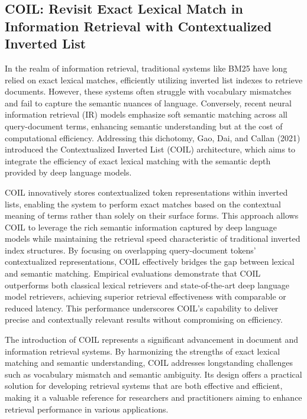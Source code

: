 \subsection{COIL: Revisit Exact Lexical Match in Information Retrieval with Contextualized Inverted List}

In the realm of information retrieval, traditional systems like BM25 have long relied on exact lexical matches, efficiently utilizing inverted list indexes to retrieve documents. However, these systems often struggle with vocabulary mismatches and fail to capture the semantic nuances of language. Conversely, recent neural information retrieval (IR) models emphasize soft semantic matching across all query-document terms, enhancing semantic understanding but at the cost of computational efficiency. Addressing this dichotomy, Gao, Dai, and Callan (2021) introduced the Contextualized Inverted List (COIL) architecture, which aims to integrate the efficiency of exact lexical matching with the semantic depth provided by deep language models.

COIL innovatively stores contextualized token representations within inverted lists, enabling the system to perform exact matches based on the contextual meaning of terms rather than solely on their surface forms. This approach allows COIL to leverage the rich semantic information captured by deep language models while maintaining the retrieval speed characteristic of traditional inverted index structures. By focusing on overlapping query-document tokens' contextualized representations, COIL effectively bridges the gap between lexical and semantic matching. Empirical evaluations demonstrate that COIL outperforms both classical lexical retrievers and state-of-the-art deep language model retrievers, achieving superior retrieval effectiveness with comparable or reduced latency. This performance underscores COIL's capability to deliver precise and contextually relevant results without compromising on efficiency.

The introduction of COIL represents a significant advancement in document and information retrieval systems. By harmonizing the strengths of exact lexical matching and semantic understanding, COIL addresses longstanding challenges such as vocabulary mismatch and semantic ambiguity. Its design offers a practical solution for developing retrieval systems that are both effective and efficient, making it a valuable reference for researchers and practitioners aiming to enhance retrieval performance in various applications.

